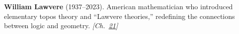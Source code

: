 \textbf{William Lawvere} (1937–2023). American mathematician who introduced elementary topos theory and ``Lawvere theories,'' redefining the connections between logic and geometry. \emph{[Ch.~\hyperref[ch:exponentialmapslietheory]{21}]}


